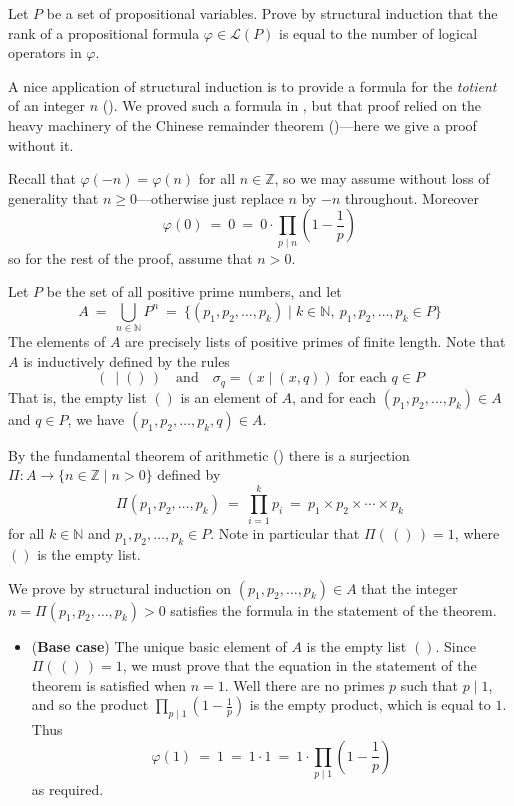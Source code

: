 \begin{exercise}
Let $P$ be a set of propositional variables. Prove by structural induction that the rank of a propositional formula $\varphi \in \mathcal{L}(P)$ is equal to the number of logical operators in $\varphi$.
\end{exercise}

A nice application of structural induction is to provide a formula for the \textit{totient} of an integer $n$ (). We proved such a formula in , but that proof relied on the heavy machinery of the Chinese remainder theorem ()---here we give a proof without it.

\rthmTotientFormula*

\begin{cproof}
Recall that $\varphi(-n) = \varphi(n)$ for all $n \in \mathbb{Z}$, so we may assume without loss of generality that $n \ge 0$---otherwise just replace $n$ by $-n$ throughout.
Moreover
\[ \varphi(0) ~=~ 0 ~=~ 0 \cdot \prod_{p \mid n} \left( 1- \frac{1}{p} \right) \]
so for the rest of the proof, assume that $n>0$.

Let $P$ be the set of all positive prime numbers, and let
\[ A ~=~ \bigcup_{n \in \mathbb{N}} P^n ~=~ \{ (p_1,p_2,\dots,p_k) \mid k \in \mathbb{N},~ p_1,p_2,\dots,p_k \in P \} \]
The elements of $A$ are precisely lists of positive primes of finite length. Note that $A$ is inductively defined by the rules
\[ (~ \mid ()\,) \quad \text{and} \quad \sigma_q = (x \mid (x,q)) \text{ for each } q \in P \]
That is, the empty list $()$ is an element of $A$, and for each $(p_1,p_2,\dots,p_k) \in A$ and $q \in P$, we have $(p_1,p_2,\dots,p_k,q) \in A$.

By the fundamental theorem of arithmetic () there is a surjection $\Pi : A \to \{ n \in \mathbb{Z} \mid n > 0 \}$ defined by
\[ \Pi(p_1,p_2,\dots,p_k) ~=~ \prod_{i=1}^k p_i ~=~ p_1 \times p_2 \times \cdots \times p_k \]
for all $k \in \mathbb{N}$ and $p_1,p_2,\dots,p_k \in P$. Note in particular that $\Pi(\,()\,) = 1$, where $()$ is the empty list.

We prove by structural induction on $(p_1,p_2,\dots,p_k) \in A$ that the integer $n = \Pi(p_1,p_2,\dots,p_k) > 0$ satisfies the formula in the statement of the theorem. 

\begin{itemize}
\item (\textbf{Base case}) The unique basic element of $A$ is the empty list $()$. Since $\Pi(\,()\,) = 1$, we must prove that the equation in the statement of the theorem is satisfied when $n=1$. Well there are no primes $p$ such that $p \mid 1$, and so the product $\prod_{p \mid 1} \left( 1 - \frac{1}{p} \right)$ is the empty product, which is equal to $1$. Thus
\[ \varphi(1) ~=~ 1 ~=~ 1 \cdot 1 ~=~ 1 \cdot \prod_{p \mid 1} \left( 1- \frac{1}{p} \right) \]
as required.


\end{itemize}
\end{cproof}
